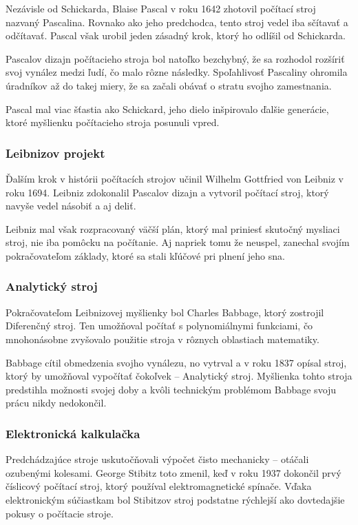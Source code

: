 Nezávisle od Schickarda, Blaise Pascal v roku 1642 zhotovil počítací stroj nazvaný Pascalina. Rovnako ako jeho predchodca, tento stroj vedel iba sčítavať a odčítavať. Pascal však urobil jeden zásadný krok, ktorý ho odlíšil od Schickarda.

Pascalov dizajn počítacieho stroja bol natoľko bezchybný, že sa rozhodol rozšíriť svoj vynález medzi ľudí, čo malo rôzne následky. Spoľahlivosť Pascaliny ohromila úradníkov až do takej miery, že sa začali obávať o stratu svojho zamestnania.

Pascal mal viac šťastia ako Schickard, jeho dielo inšpirovalo ďalšie generácie, ktoré myšlienku počítacieho stroja posunuli vpred.

\subsubsection{Leibnizov projekt}

Ďalším krok v histórii počítacích strojov učinil Wilhelm Gottfried von Leibniz v roku 1694. Leibniz zdokonalil Pascalov dizajn a vytvoril počítací stroj, ktorý navyše vedel násobiť a aj deliť.

Leibniz mal však rozpracovaný väčší plán, ktorý mal priniesť skutočný mysliaci stroj, nie iba pomôcku na počítanie. Aj napriek tomu že neuspel, zanechal svojím pokračovateľom základy, ktoré sa stali kľúčové pri plnení jeho sna.

\subsubsection{Analytický stroj}

Pokračovateľom Leibnizovej myšlienky bol Charles Babbage, ktorý zostrojil Diferenčný stroj. Ten umožňoval počítať s polynomiálnymi funkciami, čo mnohonásobne zvyšovalo použitie stroja v rôznych oblastiach matematiky.

Babbage cítil obmedzenia svojho vynálezu, no vytrval a v roku 1837 opísal stroj, ktorý by umožňoval vypočítať čokoľvek -- Analytický stroj. Myšlienka tohto stroja predstihla možnosti svojej doby a kvôli technickým problémom Babbage svoju prácu nikdy nedokončil.

\subsubsection{Elektronická kalkulačka}

Predchádzajúce stroje uskutočňovali výpočet čisto mechanicky -- otáčali ozubenými kolesami. George Stibitz toto zmenil, keď v roku 1937 dokončil prvý číslicový počítací stroj, ktorý používal elektromagnetické spínače. Vďaka elektronickým súčiastkam bol Stibitzov stroj podstatne rýchlejší ako dovtedajšie pokusy o počítacie stroje.

